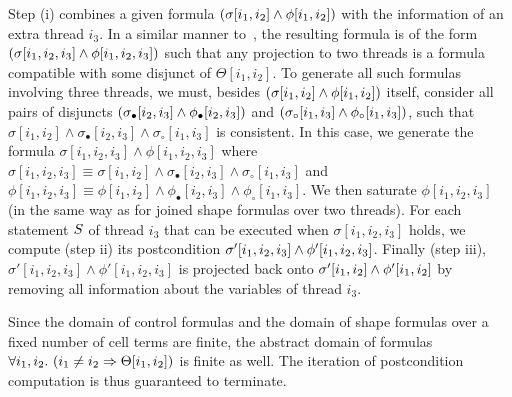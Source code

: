 Step (i) combines a given formula $(\sigma[i_1,i_2] \land
\phi[i_1,i_2])$ with the information of an extra thread $i_3$.
%
In a similar manner to~\cite{AbHoHa:view:abstraction}, the resulting
formula is of the form \( \left( \sigma[i_1,i_2,i_3] \land
  \phi[i_1,i_2,i_3] \right) \) such that any projection to two
threads is a formula compatible with some disjunct of $\Theta[i_1,i_2]$.
%
To generate all such formulas involving three threads, we must, besides
$(\sigma[i_1,i_2] \land \phi[i_1,i_2])$ itself, consider
all pairs of disjuncts %
$(\sigma_\bullet[i_2,i_3] \land \phi_\bullet[i_2,i_3])$ and %
$(\sigma_\circ[i_1,i_3] \land \phi_\circ[i_1,i_3])$, %
such that $\sigma[i_1,i_2] \land \sigma_\bullet[i_2,i_3] \land
\sigma_\circ[i_1,i_3]$ is consistent. %
In this case, we generate the formula \(\sigma[i_1,i_2,i_3] \land
\phi[i_1,i_2,i_3]\) where 
$\sigma[i_1,i_2,i_3] \equiv \sigma[i_1,i_2] \land \sigma_\bullet[i_2,i_3] \land \sigma_\circ[i_1,i_3]$ and 
$\phi[i_1,i_2,i_3] \equiv \phi[i_1,i_2] \land \phi_\bullet[i_2,i_3] \land \phi_\circ[i_1,i_3]$. %
We then saturate \(\phi[i_1,i_2,i_3]\) (in the same way as for
joined shape formulas over two threads). %
%
For each statement $S$ of thread $i_3$ that can be executed when
$\sigma[i_1,i_2,i_3]$ holds, we compute (step ii) its postcondition
\(\sigma'[i_1,i_2,i_3] \land \phi'[i_1,i_2,i_3]\). %
Finally (step iii), \(\sigma'[i_1,i_2,i_3] \land \phi'[i_1,i_2,i_3]\)
is projected back onto \(\sigma'[i_1,i_2] \land
\phi'[i_1,i_2]\) by removing all information about the
variables of thread $i_3$.

Since the domain of control formulas and the domain of shape formulas
over a fixed number of cell terms are finite, the abstract domain of
formulas %
$\forall i_1, i_2. \ (i_1 \neq i_2 \Rightarrow \Theta[i_1,i_2])$ %
is finite as well. %
The iteration of postcondition computation is thus guaranteed to
terminate.



